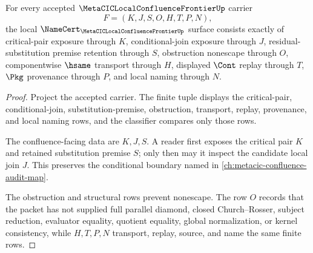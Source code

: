 \begin{theorem}
\label{thm:metacic-local-confluence-frontier-namecert-obligations}
For every accepted $\MetaCICLocalConfluenceFrontierUp$ carrier
$$
F=(K,J,S,O,H,T,P,N),
$$
the local $\NameCert_{\MetaCICLocalConfluenceFrontierUp}$ surface consists exactly of critical-pair exposure through $K$, conditional-join exposure through $J$, residual-substitution premise retention through $S$, obstruction nonescape through $O$, componentwise $\hsame$ transport through $H$, displayed $\Cont$ replay through $T$, $\Pkg$ provenance through $P$, and local naming through $N$.
\end{theorem}
\begin{proof}
Project the accepted carrier. The finite tuple displays the critical-pair, conditional-join, substitution-premise, obstruction, transport, replay, provenance, and local naming rows, and the classifier compares only those rows.

The confluence-facing data are $K,J,S$. A reader first exposes the critical pair $K$ and retained substitution premise $S$; only then may it inspect the candidate local join $J$. This preserves the conditional boundary named in \autoref{ch:metacic-confluence-audit-map}.

The obstruction and structural rows prevent nonescape. The row $O$ records that the packet has not supplied full parallel diamond, closed Church--Rosser, subject reduction, evaluator equality, quotient equality, global normalization, or kernel consistency, while $H,T,P,N$ transport, replay, source, and name the same finite rows.
\end{proof}

